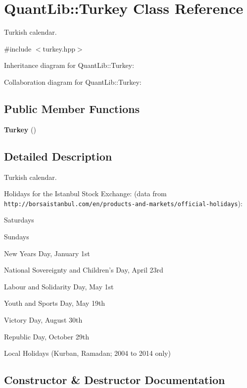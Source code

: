 \section{Quant\+Lib\+:\+:Turkey Class Reference}
\label{class_quant_lib_1_1_turkey}


Turkish calendar.  




{\ttfamily \#include $<$turkey.\+hpp$>$}



Inheritance diagram for Quant\+Lib\+:\+:Turkey\+:


Collaboration diagram for Quant\+Lib\+:\+:Turkey\+:
\subsection*{Public Member Functions}
\begin{DoxyCompactItemize}
\item 
{\bf Turkey} ()
\end{DoxyCompactItemize}


\subsection{Detailed Description}
Turkish calendar. 

Holidays for the Istanbul Stock Exchange\+: (data from {\tt http\+://borsaistanbul.\+com/en/products-\/and-\/markets/official-\/holidays})\+: 
\begin{DoxyItemize}
\item Saturdays 
\item Sundays 
\item New Year\textquotesingle{}s Day, January 1st 
\item National Sovereignty and Children’s Day, April 23rd 
\item Labour and Solidarity Day, May 1st 
\item Youth and Sports Day, May 19th 
\item Victory Day, August 30th 
\item Republic Day, October 29th 
\item Local Holidays (Kurban, Ramadan; 2004 to 2014 only)  
\end{DoxyItemize}

\subsection{Constructor \& Destructor Documentation}
